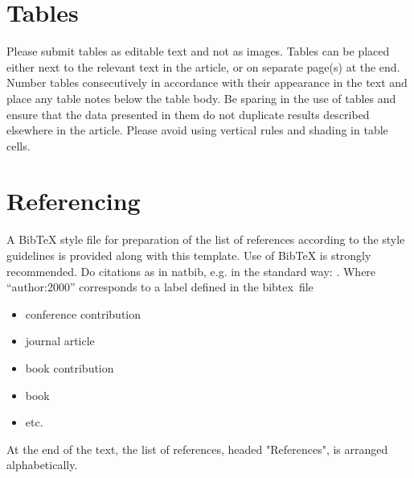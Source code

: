\documentclass{techmech}
\begin{document}
\section{Tables}
Please submit tables as editable text and not as images. Tables can be placed either next to the
relevant text in the article, or on separate page(s) at the end. Number tables consecutively in
accordance with their appearance in the text and place any table notes below the table body. Be
sparing in the use of tables and ensure that the data presented in them do not duplicate results
described elsewhere in the article. Please avoid using vertical rules and shading in table cells. \pagebreak

\section{Referencing}
A BibTeX style file for preparation of the list of references according to the style guidelines is provided along with this template. Use of BibTeX is strongly recommended.
Do citations as in natbib, e.g. in the standard way: \cite{author:2000}. Where
``author:2000'' corresponds to a label defined in the bibtex~file 
\begin{itemize}
\item conference contribution \cite{rychlewski}
\item journal article \cite{einstein}
\item book contribution \cite{truesdell-toupin}
\item book \cite{eringen}
\item etc.
\end{itemize}

At the end of the text, the list of references, headed "References", is arranged alphabetically.

\end{document}
